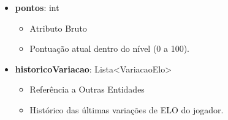 \begin{itemize}
        \item \textbf{pontos}: int  
              \begin{itemize}
                  \item Atributo Bruto
                  \item Pontuação atual dentro do nível (0 a 100).
              \end{itemize}
    
        \item \textbf{historicoVariacao}: Lista\textless VariacaoElo\textgreater  
              \begin{itemize}
                  \item Referência a Outras Entidades
                  \item Histórico das últimas variações de ELO do jogador.
              \end{itemize}
    \end{itemize}

